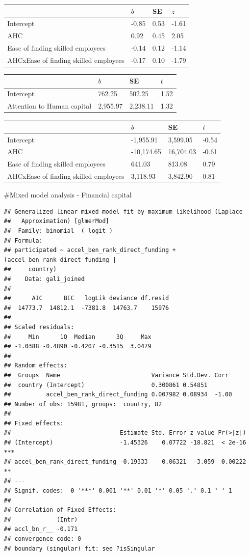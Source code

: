 \documentclass[
  english,
  man]{apa6}
\begin{document}
\begin{tabular}{l|l|l|l}
\hline
  & $b$ & SE & $z$\\
\hline
Intercept & -0.85 & 0.53 & -1.61\\
\hline
AHC & 0.92 & 0.45 & 2.05\\
\hline
Ease of finding skilled employees & -0.14 & 0.12 & -1.14\\
\hline
AHCxEase of finding skilled employees & -0.17 & 0.10 & -1.79\\
\hline
\end{tabular}

\begin{tabular}{l|l|l|l}
\hline
  & $b$ & SE & $t$\\
\hline
Intercept & 762.25 & 502.25 & 1.52\\
\hline
Attention to Human capital & 2,955.97 & 2,238.11 & 1.32\\
\hline
\end{tabular}

\begin{tabular}{l|l|l|l}
\hline
  & $b$ & SE & $t$\\
\hline
Intercept & -1,955.91 & 3,599.05 & -0.54\\
\hline
AHC & -10,174.65 & 16,704.03 & -0.61\\
\hline
Ease of finding skilled employees & 641.03 & 813.08 & 0.79\\
\hline
AHCxEase of finding skilled employees & 3,118.93 & 3,842.90 & 0.81\\
\hline
\end{tabular}

\#Mixed model analysis - Financial capital

\begin{verbatim}
## Generalized linear mixed model fit by maximum likelihood (Laplace
##   Approximation) [glmerMod]
##  Family: binomial  ( logit )
## Formula: 
## participated ~ accel_ben_rank_direct_funding + (accel_ben_rank_direct_funding |  
##     country)
##    Data: gali_joined
## 
##      AIC      BIC   logLik deviance df.resid 
##  14773.7  14812.1  -7381.8  14763.7    15976 
## 
## Scaled residuals: 
##     Min      1Q  Median      3Q     Max 
## -1.0388 -0.4890 -0.4207 -0.3515  3.0479 
## 
## Random effects:
##  Groups  Name                          Variance Std.Dev. Corr 
##  country (Intercept)                   0.300861 0.54851       
##          accel_ben_rank_direct_funding 0.007982 0.08934  -1.00
## Number of obs: 15981, groups:  country, 82
## 
## Fixed effects:
##                               Estimate Std. Error z value Pr(>|z|)    
## (Intercept)                   -1.45326    0.07722 -18.821  < 2e-16 ***
## accel_ben_rank_direct_funding -0.19333    0.06321  -3.059  0.00222 ** 
## ---
## Signif. codes:  0 '***' 0.001 '**' 0.01 '*' 0.05 '.' 0.1 ' ' 1
## 
## Correlation of Fixed Effects:
##             (Intr)
## accl_bn_r__ -0.171
## convergence code: 0
## boundary (singular) fit: see ?isSingular
\end{verbatim}
\end{document}
